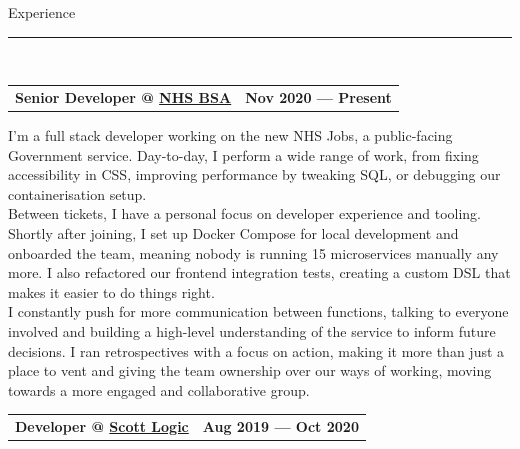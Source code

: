\documentclass[hidelinks, 12pt, a4paper]{article}
\begin{document}
	\vspace{12pt}

	\begin{Large}Experience\end{Large}
	\rule{200pt}{1pt}\\
	
	\vspace{-2pt}
	
	\begin{tabularx}{\linewidth}{X r}
		\textbf{Senior Developer @ \href{https://www.nhsbsa.nhs.uk/}{NHS BSA}} & \textbf{Nov 2020 --- Present}
	\end{tabularx}\vspace{2pt}

	\hspace{0.05\linewidth}\begin{minipage}{0.95\linewidth}
		I'm a full stack developer working on the new NHS Jobs, a public-facing Government service.
		Day-to-day, I perform a wide range of work, from fixing accessibility in CSS, improving performance by tweaking SQL, or debugging our containerisation setup.\\
		
		Between tickets, I have a personal focus on developer experience and tooling.
		Shortly after joining, I set up Docker Compose for local development and onboarded the team, meaning nobody is running 15 microservices manually any more.
		I also refactored our frontend integration tests, creating a custom DSL that makes it easier to do things right.\\
		
		I constantly push for more communication between functions, talking to everyone involved and building a high-level understanding of the service to inform future decisions.
		I ran retrospectives with a focus on action, making it more than just a place to vent and giving the team ownership over our ways of working, moving towards a more engaged and collaborative group.\\
	\end{minipage}
	
	
	\begin{tabularx}{\linewidth}{X r}
		\textbf{Developer @ \href{https://www.scottlogic.com/}{Scott Logic}} & \textbf{Aug 2019 --- Oct 2020}
	\end{tabularx}\vspace{2pt}
	
\end{document}
